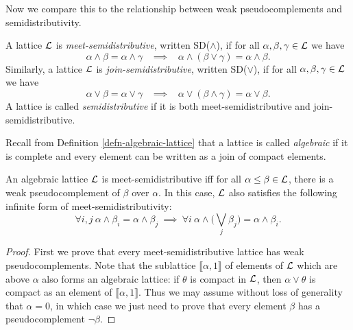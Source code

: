 \begin{appendices}
Now we compare this to the relationship between weak pseudocomplements and semidistributivity.

\begin{defn} A lattice $\mathcal{L}$ is \emph{meet-semidistributive}, written SD($\wedge$), if for all $\alpha, \beta, \gamma \in \mathcal{L}$ we have
\[
\alpha \wedge \beta = \alpha \wedge \gamma \;\;\; \implies \;\;\; \alpha \wedge (\beta \vee \gamma) = \alpha \wedge \beta.
\]
Similarly, a lattice $\mathcal{L}$ is \emph{join-semidistributive}, written SD($\vee$), if for all $\alpha, \beta, \gamma \in \mathcal{L}$ we have
\[
\alpha \vee \beta = \alpha \vee \gamma \;\;\; \implies \;\;\; \alpha \vee (\beta \wedge \gamma) = \alpha \vee \beta.
\]
A lattice is called \emph{semidistributive} if it is both meet-semidistributive and join-semidistributive.
\end{defn}

Recall from Definition \ref{defn-algebraic-lattice} that a lattice is called \emph{algebraic} if it is complete and every element can be written as a join of compact elements.

\begin{prop}\label{prop-infinite-semidistributive-algebraic} An algebraic lattice $\mathcal{L}$ is meet-semidistributive iff for all $\alpha \le \beta \in \mathcal{L}$, there is a weak pseudocomplement of $\beta$ over $\alpha$. In this case, $\mathcal{L}$ also satisfies the following infinite form of meet-semidistributivity:
\[
\forall i,j\  \alpha \wedge \beta_i = \alpha \wedge \beta_j \ \implies\ \forall i\ \alpha \wedge \Big(\bigvee_j \beta_j\Big) = \alpha \wedge \beta_i.\label{infinite-meet-semidistributive-law}\tag{SD$_\infty$($\wedge$)}
\]
\end{prop}
\begin{proof} First we prove that every meet-semidistributive lattice has weak pseudocomplements. Note that the sublattice $\llbracket \alpha, 1 \rrbracket$ of elements of $\mathcal{L}$ which are above $\alpha$ also forms an algebraic lattice: if $\theta$ is compact in $\mathcal{L}$, then $\alpha \vee \theta$ is compact as an element of $\llbracket \alpha, 1 \rrbracket$. Thus we may assume without loss of generality that $\alpha = 0$, in which case we just need to prove that every element $\beta$ has a pseudocomplement $\neg \beta$.


\end{proof}
\end{appendices}
